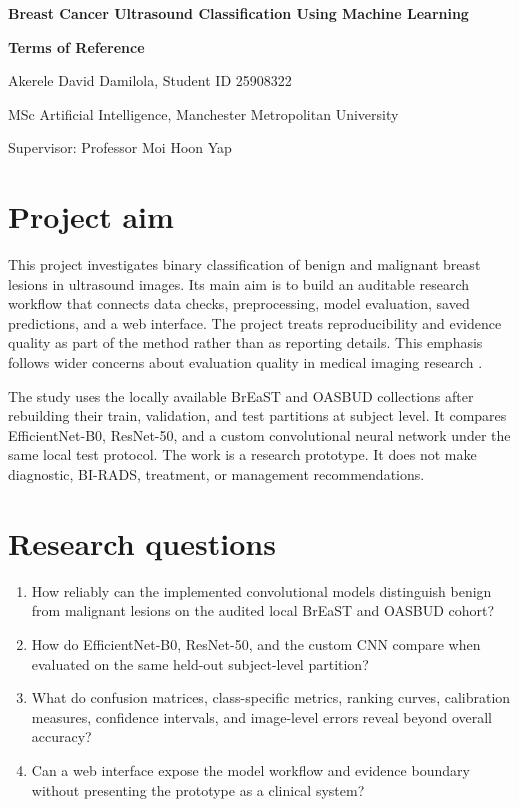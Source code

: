 \documentclass[10pt]{article}
\begin{document}
\begin{center}
  {\fontsize{14pt}{17pt}\selectfont\bfseries Breast Cancer Ultrasound Classification Using Machine Learning\par}
  \vspace{0.4\baselineskip}
  \vspace{0.7\baselineskip}
  {\bfseries Terms of Reference\par}
  \vspace{0.8\baselineskip}
  Akerele David Damilola, Student ID 25908322\par
  MSc Artificial Intelligence, Manchester Metropolitan University\par
  Supervisor: Professor Moi Hoon Yap
\end{center}

\section{Project aim}

This project investigates binary classification of benign and malignant breast lesions in ultrasound images. Its main aim is to build an auditable research workflow that connects data checks, preprocessing, model evaluation, saved predictions, and a web interface. The project treats reproducibility and evidence quality as part of the method rather than as reporting details. This emphasis follows wider concerns about evaluation quality in medical imaging research \citep{Litjens2017,Kelly2019}.

The study uses the locally available BrEaST and OASBUD collections after rebuilding their train, validation, and test partitions at subject level. It compares EfficientNet-B0, ResNet-50, and a custom convolutional neural network under the same local test protocol. The work is a research prototype. It does not make diagnostic, BI-RADS, treatment, or management recommendations.

\section{Research questions}

\begin{enumerate}
  \item How reliably can the implemented convolutional models distinguish benign from malignant lesions on the audited local BrEaST and OASBUD cohort?
  \item How do EfficientNet-B0, ResNet-50, and the custom CNN compare when evaluated on the same held-out subject-level partition?
  \item What do confusion matrices, class-specific metrics, ranking curves, calibration measures, confidence intervals, and image-level errors reveal beyond overall accuracy?
  \item Can a web interface expose the model workflow and evidence boundary without presenting the prototype as a clinical system?
\end{enumerate}
\end{document}

